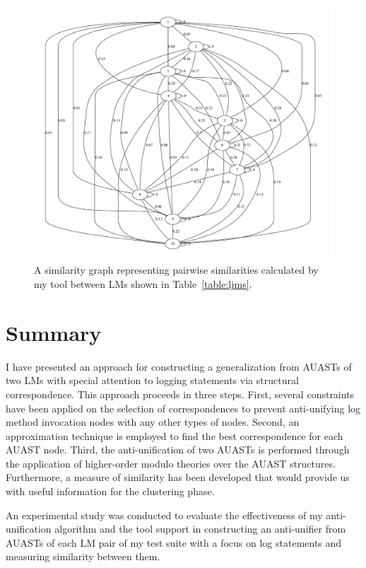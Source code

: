 \begin{figure} [t]
  \centering\includegraphics [width = \textwidth]{graphviz/au.pdf}
  \caption{A similarity graph representing pairwise similarities calculated by my tool between LMs shown in Table~\ref{table:ljms}.}
  \label{fig:au_graph}
\end{figure}




\section{Summary} \label{meth1-summary}
I have presented an approach for constructing a generalization from AUASTs of two LMs with special attention to logging statements via structural correspondence. This approach proceeds in three steps. First, several constraints have been applied on the selection of correspondences to prevent anti-unifying log method invocation nodes with any other types of nodes. Second, an approximation technique is employed to find the best correspondence for each AUAST node. Third, the anti-unification of two AUASTs is performed through the application of higher-order modulo theories over the AUAST structures. Furthermore, a measure of similarity has been developed that would provide us with useful information for the clustering phase.

An experimental study was conducted to evaluate the effectiveness of my anti-unification algorithm and the tool support in constructing an anti-unifier from AUASTs of each LM pair of my test suite with a focus on log statements and measuring similarity between them.







